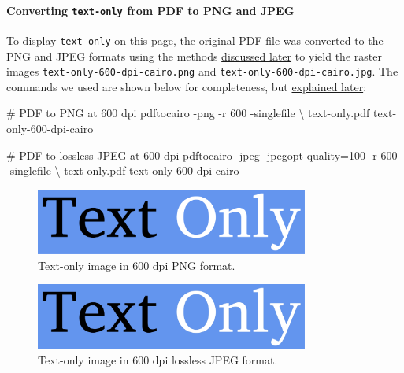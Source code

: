 \documentclass[
  11pt,
  british,
  a4paper,
]{article}
\newenvironment{Shaded}{\begin{snugshade}}{\end{snugshade}}
\newcommand{\AttributeTok}[1]{\textcolor[rgb]{0.80,0.80,0.80}{#1}}
\newcommand{\CommentTok}[1]{\textcolor[rgb]{0.50,0.62,0.50}{#1}}
\newcommand{\DataTypeTok}[1]{\textcolor[rgb]{0.87,0.87,0.75}{#1}}
\newcommand{\ExtensionTok}[1]{\textcolor[rgb]{0.80,0.80,0.80}{#1}}
\newcommand{\NormalTok}[1]{\textcolor[rgb]{0.80,0.80,0.80}{#1}}
\begin{document}
\hypertarget{converting-text-only-from-pdf-to-png-and-jpeg}{%
\paragraph{\texorpdfstring{Converting \texttt{text-only} from PDF to PNG
and
JPEG}{Converting text-only from PDF to PNG and JPEG}}\label{converting-text-only-from-pdf-to-png-and-jpeg}}

To display \texttt{text-only} on this page, the original PDF file was
converted to the PNG and JPEG formats using the methods
\protect\hyperlink{vector-to-raster}{discussed later} to yield the
raster images \texttt{text-only-600-dpi-cairo.png} and
\texttt{text-only-600-dpi-cairo.jpg}. The commands we used are shown
below for completeness, but
\protect\hyperlink{pdf-to-png-and-jpeg-poppler-and-cairo}{explained
later}:

\begin{Shaded}
\begin{Highlighting}[]
\CommentTok{\# PDF to PNG at 600 dpi}
\ExtensionTok{pdftocairo} \AttributeTok{{-}png} \AttributeTok{{-}r}\NormalTok{ 600 }\AttributeTok{{-}singlefile} \DataTypeTok{\textbackslash{}}
\NormalTok{text{-}only.pdf text{-}only{-}600{-}dpi{-}cairo}

\CommentTok{\# PDF to lossless JPEG at 600 dpi}
\ExtensionTok{pdftocairo} \AttributeTok{{-}jpeg} \AttributeTok{{-}jpegopt}\NormalTok{ quality=100 }\AttributeTok{{-}r}\NormalTok{ 600 }\AttributeTok{{-}singlefile} \DataTypeTok{\textbackslash{}}
\NormalTok{text{-}only.pdf text{-}only{-}600{-}dpi{-}cairo}
\end{Highlighting}
\end{Shaded}

\begin{figure}
\hypertarget{fig:text-only-png-cairo}{%
\centering
\includegraphics[width=0.8\textwidth,height=\textheight]{images/text-only-600-dpi-cairo.png}
\caption{Text-only image in 600 dpi PNG
format.}\label{fig:text-only-png-cairo}
}
\end{figure}

\begin{figure}
\hypertarget{fig:text-only-jpg-cairo}{%
\centering
\includegraphics[width=0.8\textwidth,height=\textheight]{images/text-only-600-dpi-cairo.jpg}
\caption{Text-only image in 600 dpi lossless JPEG
format.}\label{fig:text-only-jpg-cairo}
}
\end{figure}
\end{document}
